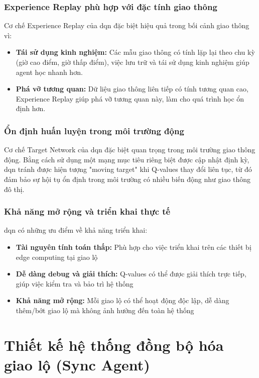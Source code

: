 \subsubsection{Experience Replay phù hợp với đặc tính giao thông}
Cơ chế Experience Replay của \ac{dqn} đặc biệt hiệu quả trong bối cảnh giao thông vì:
\begin{itemize}
    \item \textbf{Tái sử dụng kinh nghiệm:} Các mẫu giao thông có tính lặp lại theo chu kỳ (giờ cao điểm, giờ thấp điểm), việc lưu trữ và tái sử dụng kinh nghiệm giúp agent học nhanh hơn.
    \item \textbf{Phá vỡ tương quan:} Dữ liệu giao thông liên tiếp có tính tương quan cao, Experience Replay giúp phá vỡ tương quan này, làm cho quá trình học ổn định hơn.
\end{itemize}

\subsubsection{Ổn định huấn luyện trong môi trường động}
Cơ chế Target Network của \ac{dqn} đặc biệt quan trọng trong môi trường giao thông động. Bằng cách sử dụng một mạng mục tiêu riêng biệt được cập nhật định kỳ, \ac{dqn} tránh được hiện tượng "moving target" khi Q-values thay đổi liên tục, từ đó đảm bảo sự hội tụ ổn định trong môi trường có nhiều biến động như giao thông đô thị.

\subsubsection{Khả năng mở rộng và triển khai thực tế}
\ac{dqn} có những ưu điểm về khả năng triển khai:
\begin{itemize}
    \item \textbf{Tài nguyên tính toán thấp:} Phù hợp cho việc triển khai trên các thiết bị edge computing tại giao lộ
    \item \textbf{Dễ dàng debug và giải thích:} Q-values có thể được giải thích trực tiếp, giúp việc kiểm tra và bảo trì hệ thống
    \item \textbf{Khả năng mở rộng:} Mỗi giao lộ có thể hoạt động độc lập, dễ dàng thêm/bớt giao lộ mà không ảnh hưởng đến toàn hệ thống
\end{itemize}

\section{Thiết kế hệ thống đồng bộ hóa giao lộ (Sync Agent)}

